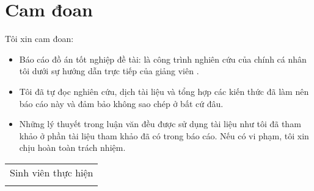\chapter*{Cam đoan}
Tôi xin cam đoan:
\begin{itemize}
	\item Báo cáo đồ án tốt nghiệp đề tài: \emph{\@title} là công trình nghiên cứu của chính cá nhân tôi dưới sự hướng dẫn trực tiếp của giảng viên \advisor.
	\item Tôi đã tự đọc nghiên cứu, dịch tài liệu và tổng hợp các kiến thức đã làm nên báo cáo này và đảm bảo không sao chép ở bất cứ đâu.
	\item Những lý thuyết trong luận văn đều được sử dụng tài liệu như tôi đã tham khảo ở phần tài liệu tham khảo đã có trong báo cáo. Nếu có vi phạm, tôi xin chịu hoàn toàn trách nhiệm.
\end{itemize}

\vspace{1cm}

\hspace*{\fill}
\begin{tabular}{c}  %
	{\large Sinh viên thực hiện}
	\vspace{3cm}\\
	\@author
\end{tabular}

